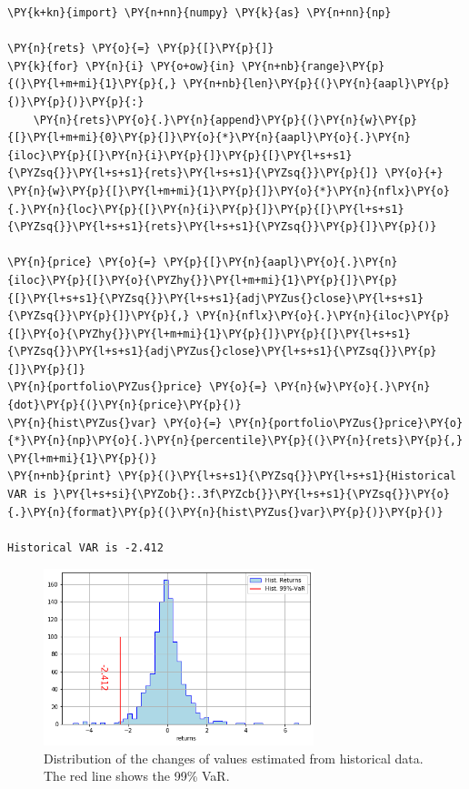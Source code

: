 \begin{tcolorbox}[breakable, size=fbox, boxrule=1pt, pad at break*=1mm,colback=cellbackground, colframe=cellborder]
\begin{Verbatim}[commandchars=\\\{\}]
\PY{k+kn}{import} \PY{n+nn}{numpy} \PY{k}{as} \PY{n+nn}{np}
				
\PY{n}{rets} \PY{o}{=} \PY{p}{[}\PY{p}{]}
\PY{k}{for} \PY{n}{i} \PY{o+ow}{in} \PY{n+nb}{range}\PY{p}{(}\PY{l+m+mi}{1}\PY{p}{,} \PY{n+nb}{len}\PY{p}{(}\PY{n}{aapl}\PY{p}{)}\PY{p}{)}\PY{p}{:}
    \PY{n}{rets}\PY{o}{.}\PY{n}{append}\PY{p}{(}\PY{n}{w}\PY{p}{[}\PY{l+m+mi}{0}\PY{p}{]}\PY{o}{*}\PY{n}{aapl}\PY{o}{.}\PY{n}{iloc}\PY{p}{[}\PY{n}{i}\PY{p}{]}\PY{p}{[}\PY{l+s+s1}{\PYZsq{}}\PY{l+s+s1}{rets}\PY{l+s+s1}{\PYZsq{}}\PY{p}{]} \PY{o}{+} \PY{n}{w}\PY{p}{[}\PY{l+m+mi}{1}\PY{p}{]}\PY{o}{*}\PY{n}{nflx}\PY{o}{.}\PY{n}{loc}\PY{p}{[}\PY{n}{i}\PY{p}{]}\PY{p}{[}\PY{l+s+s1}{\PYZsq{}}\PY{l+s+s1}{rets}\PY{l+s+s1}{\PYZsq{}}\PY{p}{]}\PY{p}{)}
		
\PY{n}{price} \PY{o}{=} \PY{p}{[}\PY{n}{aapl}\PY{o}{.}\PY{n}{iloc}\PY{p}{[}\PY{o}{\PYZhy{}}\PY{l+m+mi}{1}\PY{p}{]}\PY{p}{[}\PY{l+s+s1}{\PYZsq{}}\PY{l+s+s1}{adj\PYZus{}close}\PY{l+s+s1}{\PYZsq{}}\PY{p}{]}\PY{p}{,} \PY{n}{nflx}\PY{o}{.}\PY{n}{iloc}\PY{p}{[}\PY{o}{\PYZhy{}}\PY{l+m+mi}{1}\PY{p}{]}\PY{p}{[}\PY{l+s+s1}{\PYZsq{}}\PY{l+s+s1}{adj\PYZus{}close}\PY{l+s+s1}{\PYZsq{}}\PY{p}{]}\PY{p}{]}
\PY{n}{portfolio\PYZus{}price} \PY{o}{=} \PY{n}{w}\PY{o}{.}\PY{n}{dot}\PY{p}{(}\PY{n}{price}\PY{p}{)}
\PY{n}{hist\PYZus{}var} \PY{o}{=} \PY{n}{portfolio\PYZus{}price}\PY{o}{*}\PY{n}{np}\PY{o}{.}\PY{n}{percentile}\PY{p}{(}\PY{n}{rets}\PY{p}{,} \PY{l+m+mi}{1}\PY{p}{)}
\PY{n+nb}{print} \PY{p}{(}\PY{l+s+s1}{\PYZsq{}}\PY{l+s+s1}{Historical VAR is }\PY{l+s+si}{\PYZob{}:.3f\PYZcb{}}\PY{l+s+s1}{\PYZsq{}}\PY{o}{.}\PY{n}{format}\PY{p}{(}\PY{n}{hist\PYZus{}var}\PY{p}{)}\PY{p}{)}

Historical VAR is -2.412
\end{Verbatim}
\end{tcolorbox}

\begin{figure}[htb]
	\centering
	\includegraphics[width=0.7\textwidth]{figures/historical_var.png}
	\caption{Distribution of the changes of values estimated from historical data. The red line shows the 99\% VaR.}
	\label{fig:hist_var}
\end{figure}

